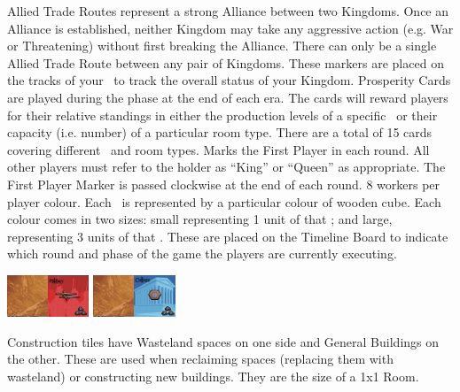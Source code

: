 \documentclass[10pt,twocolumn]{article}
\begin{document}
Allied Trade Routes represent a strong Alliance between two Kingdoms. Once an Alliance is established, neither Kingdom may take any aggressive action (e.g. War or Threatening) without first breaking the Alliance. There can only be a single Allied Trade Route between any pair of Kingdoms.
These markers are placed on the tracks of your \psb\ to track the overall status of your Kingdom.
Prosperity Cards are played during the  phase at the end of each era. The cards will reward players for their relative standings in either the production levels of a specific \good\ or their capacity (i.e. number) of a particular room type. There are a total of 15 cards covering different \goods\ and room types.
Marks the First Player in each round. All other players must refer to the holder as ``King'' or ``Queen'' as appropriate. The First Player Marker is passed clockwise at the end of each round.
8 workers per player colour.
Each \good\ is represented by a particular colour of wooden cube. Each colour comes in two sizes: small representing 1 unit of that \good; and large, representing 3 units of that \good.
These are placed on the Timeline Board to indicate which round and phase of the game the players are currently executing.
\centerline{\includegraphics[height=1.25cm]{CT1}\includegraphics[height=1.25cm]{CT2}  \includegraphics[height=1.25cm]{CT3}\includegraphics[height=1.25cm]{CT4}}
Construction tiles have Wasteland spaces on one side and General Buildings on the other. These are used when reclaiming spaces (replacing them with wasteland) or constructing new buildings. They are the size of a 1x1 Room.
\end{document}
